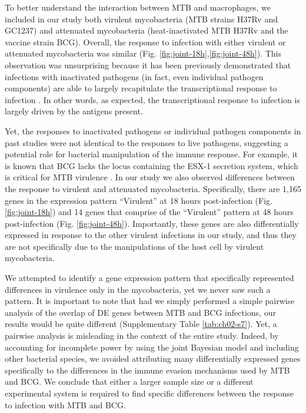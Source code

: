 To better understand the interaction between MTB and macrophages, we
included in our study both virulent mycobacteria (MTB strains H37Rv and
GC1237) and attenuated mycobacteria (heat-inactivated MTB H37Rv and the
vaccine strain BCG). Overall, the response to infection with either
virulent or attenuated mycobacteria was similar (Fig. \ref{fig:joint-18h},\ref{fig:joint-48h}). This
observation was unsurprising because it has been previously demonstrated
that infections with inactivated pathogens (in fact, even individual
pathogen components) are able to largely recapitulate the
transcriptional response to infection \citep{Huang2001, Boldrick2002,
Nau2002, Jenner2005}. In other words, as expected, the
transcriptional response to infection is largely driven by the antigens
present.

Yet, the responses to inactivated pathogens or individual pathogen
components in past studies were not identical to the responses to live
pathogens, suggesting a potential role for bacterial manipulation of the
immune response. For example, it is known that BCG lacks the locus
containing the ESX-1 secretion system, which is critical for MTB
virulence \citep{Behr1999, Pym2002, Hsu2003, Simeone2009}. In our
study we also observed differences between the response to virulent and
attenuated mycobacteria. Specifically, there are 1,165 genes in the
expression pattern ``Virulent'' at 18 hours post-infection (Fig. \ref{fig:joint-18h})
and 14 genes that comprise of the ``Virulent'' pattern at 48 hours
post-infection (Fig. \ref{fig:joint-48h}). Importantly, these genes are also
differentially expressed in response to the other virulent infections in
our study, and thus they are not specifically due to the manipulations
of the host cell by virulent mycobacteria.

We attempted to identify a gene expression pattern that specifically
represented differences in virulence only in the mycobacteria, yet we
never saw such a pattern. It is important to note that had we simply
performed a simple pairwise analysis of the overlap of DE genes between
MTB and BCG infections, our results would be quite different
(Supplementary Table \ref{tab:ch02-s7}). Yet, a pairwise analysis is misleading in the
context of the entire study. Indeed, by accounting for incomplete power
by using the joint Bayesian model and including other bacterial species,
we avoided attributing many differentially expressed genes specifically
to the differences in the immune evasion mechanisms used by MTB and BCG.
We conclude that either a larger sample size or a different experimental
system is required to find specific differences between the response to
infection with MTB and BCG.

